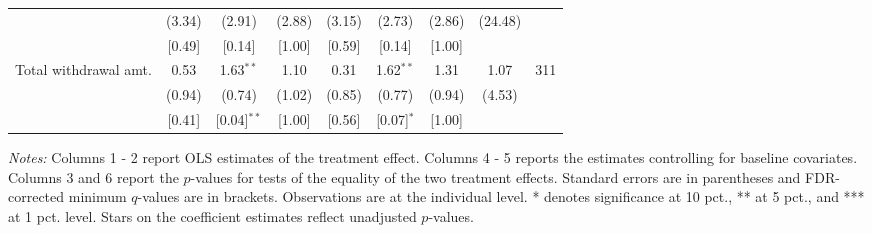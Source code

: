 \begin{table}[h]
{\begin{threeparttable}
\begin{tabular}{l*{8}{c}}
          &   (3.34)&   (2.91)&   (2.88)&   (3.15)&   (2.73)&   (2.86)&  (24.48)&         \\
          &   [0.49]&   [0.14]&   [1.00]&   [0.59]&   [0.14]&   [1.00]&         &         \\
Total withdrawal amt.&     0.53&1.63$^{**}$&     1.10&     0.31&1.62$^{**}$&     1.31&     1.07&      311\\
          &   (0.94)&   (0.74)&   (1.02)&   (0.85)&   (0.77)&   (0.94)&   (4.53)&         \\
          &   [0.41]&[0.04]$^{**}$&   [1.00]&   [0.56]&[0.07]$^{*}$&   [1.00]&         &         \\
\bottomrule \end{tabular} \begin{tablenotes}[flushleft] \footnotesize \item \emph{Notes:} Columns 1 - 2 report OLS estimates of the treatment effect. Columns 4 - 5 reports the estimates controlling for baseline covariates. Columns 3 and 6 report the \(p\)-values for tests of the equality of the two treatment effects. Standard errors are in parentheses and FDR-corrected minimum \(q\)-values are in brackets. Observations are at the individual level. * denotes significance at 10 pct., ** at 5 pct., and *** at 1 pct. level. Stars on the coefficient estimates reflect unadjusted \(p\)-values. \end{tablenotes} \end{threeparttable} } \end{table}

